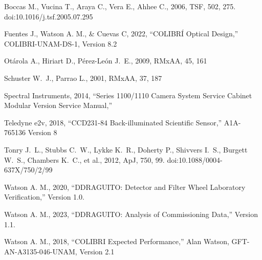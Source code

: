 \clearpage
\begin{thebibliography}{}
\raggedright

 Boccas M., Vucina T., Araya C., Vera E., Ahhee C., 2006, TSF, 502, 275. doi:10.1016/j.tsf.2005.07.295

Fuentes J., Watson A. M., \& Cuevas C, 2022, “COLIBRÍ Optical Design,” COLIBRI-UNAM-DS-1, Version 8.2

 Ot{\'a}rola A., Hiriart D., P{\'e}rez-Le{\'o}n J.~E., 2009, RMxAA, 45, 161

 Schuster W.~J., Parrao L., 2001, RMxAA, 37, 187

Spectral Instruments, 2014, “Series 1100/1110 Camera System Service Cabinet Modular Version Service Manual,”

Teledyne e2v, 2018, “CCD231-84 Back-illuminated Scientific Sensor,” A1A-765136 Version 8

 Tonry J.~L., Stubbs C.~W., Lykke K.~R., Doherty P., Shivvers I.~S., Burgett W.~S., Chambers K.~C., et al., 2012, ApJ, 750, 99. doi:10.1088/0004-637X/750/2/99

Watson A. M., 2020, “DDRAGUITO: Detector and Filter Wheel Laboratory Verification,” Version 1.0.

Watson A. M., 2023, “DDRAGUITO: Analysis of Commissioning Data,” Version 1.1.

Watson A. M., 2018, “COLIBRI Expected Performance,” Alan Watson, GFT-AN-A3135-046-UNAM, Version 2.1




\end{thebibliography}